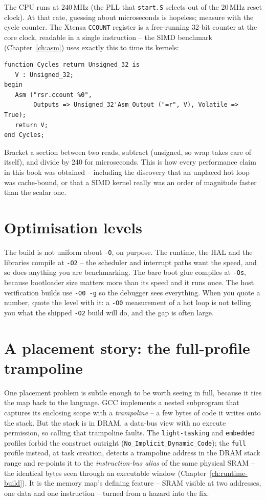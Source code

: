 The CPU runs at 240\,MHz (the PLL that \texttt{start.S} selects out of the 20\,MHz
reset clock). At that rate, guessing about microseconds is hopeless; measure with the
cycle counter. The Xtensa \texttt{CCOUNT} register is a free-running 32-bit counter
at the core clock, readable in a single instruction -- the SIMD benchmark
(Chapter~\ref{ch:asm}) uses exactly this to time its kernels:

\begin{lstlisting}
function Cycles return Unsigned_32 is
   V : Unsigned_32;
begin
   Asm ("rsr.ccount %0",
        Outputs => Unsigned_32'Asm_Output ("=r", V), Volatile => True);
   return V;
end Cycles;
\end{lstlisting}

Bracket a section between two reads, subtract (unsigned, so wrap takes care of
itself), and divide by 240 for microseconds. This is how every performance claim in
this book was obtained -- including the discovery that an unplaced hot loop was
cache-bound, or that a SIMD kernel really was an order of magnitude faster than the
scalar one.

\section{Optimisation levels}

The build is not uniform about \texttt{-O}, on purpose. The runtime, the HAL and the
libraries compile at \texttt{-O2} -- the scheduler and interrupt paths want the speed,
and so does anything you are benchmarking. The bare boot glue compiles at
\texttt{-Os}, because bootloader size matters more than its speed and it runs once.
The host verification builds use \texttt{-O0 -g} so the debugger sees everything.
When you quote a number, quote the level with it: a \texttt{-O0} measurement of a
hot loop is not telling you what the shipped \texttt{-O2} build will do, and the gap
is often large.

\section{A placement story: the full-profile trampoline}

One placement problem is subtle enough to be worth seeing in full, because it ties
the map back to the language. GCC implements a nested subprogram that captures its
enclosing scope with a \emph{trampoline} -- a few bytes of code it writes onto the
stack. But the stack is in DRAM, a data-bus view with no execute permission, so
calling that trampoline faults. The \texttt{light-tasking} and \texttt{embedded}
profiles forbid the construct outright (\texttt{No\_Implicit\_Dynamic\_Code}); the
\texttt{full} profile instead, at task creation, detects a trampoline address in the
DRAM stack range and re-points it to the \emph{instruction-bus alias} of the same
physical SRAM -- the identical bytes seen through an executable window
(Chapter~\ref{ch:runtime-build}). It is the memory map's defining feature -- SRAM
visible at two addresses, one data and one instruction -- turned from a hazard into
the fix.
